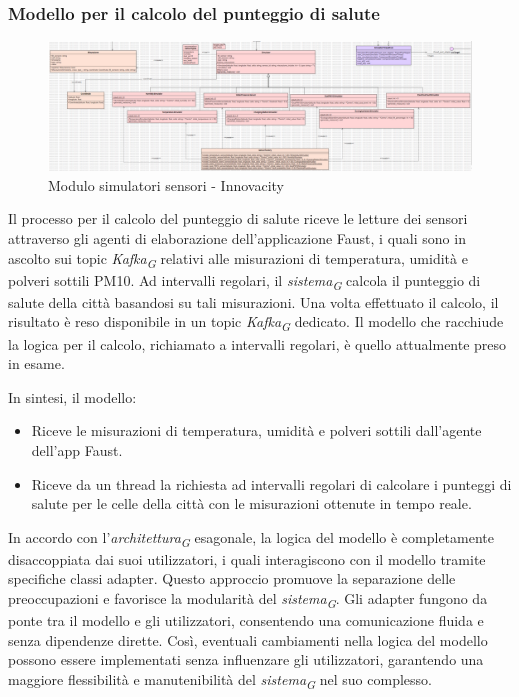 \subsubsection{Modello per il calcolo del punteggio di salute}
\begin{figure}[H]
    \centering
    \includegraphics[width=1\textwidth]{../Images/SpecificaTecnica/simulatoriSensori.PNG}
    \caption{Modulo simulatori sensori - Innovacity}
    \label{fig: fddf}
\end{figure}

Il processo per il calcolo del punteggio di salute riceve le letture dei sensori attraverso gli agenti di elaborazione dell'applicazione Faust, i quali sono in ascolto sui topic \textit{Kafka}\textsubscript{\textit{G}} relativi alle misurazioni di temperatura, umidità e polveri sottili PM10. Ad intervalli regolari, il \textit{sistema}\textsubscript{\textit{G}} calcola il punteggio di salute della città basandosi su tali misurazioni. Una volta effettuato il calcolo, il risultato è reso disponibile in un topic \textit{Kafka}\textsubscript{\textit{G}} dedicato.
Il modello che racchiude la logica per il calcolo, richiamato a intervalli regolari, è quello attualmente preso in esame.

In sintesi, il modello:
\begin{itemize}
    \item Riceve le misurazioni di temperatura, umidità e polveri sottili dall'agente dell'app Faust.
    \item Riceve da un thread la richiesta ad intervalli regolari di calcolare i punteggi di salute per le celle della città con le misurazioni ottenute in tempo reale.
\end{itemize}

In accordo con l'\textit{architettura}\textsubscript{\textit{G}} esagonale, la logica del modello è completamente disaccoppiata dai suoi utilizzatori, i quali interagiscono con il modello tramite specifiche classi adapter. Questo approccio promuove la separazione delle preoccupazioni e favorisce la modularità del \textit{sistema}\textsubscript{\textit{G}}. Gli adapter fungono da ponte tra il modello e gli utilizzatori, consentendo una comunicazione fluida e senza dipendenze dirette. Così, eventuali cambiamenti nella logica del modello possono essere implementati senza influenzare gli utilizzatori, garantendo una maggiore flessibilità e manutenibilità del \textit{sistema}\textsubscript{\textit{G}} nel suo complesso.

